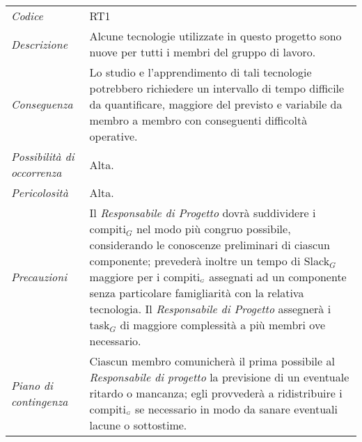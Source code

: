 \def\tabularxcolumn#1{m{#1}}
{

	\begin{center}
		\renewcommand{\arraystretch}{1.4}
		\begin{longtable}{|p{5cm}|p{12cm}|}
			\hline
			\rowcolor{airforceblue}
			\multicolumn{2}{|c|}{\textit{Inesperienza tecnologica}}\\
			\hline
			\textit{Codice} & RT1 \\
			\hline
			\textit{Descrizione} & Alcune tecnologie utilizzate in questo progetto sono nuove per tutti i membri del gruppo di lavoro. \\
			\hline
			\textit{Conseguenza} & Lo studio e l'apprendimento di tali tecnologie potrebbero richiedere un intervallo di tempo difficile da quantificare, maggiore del previsto e variabile da membro a membro con conseguenti difficoltà operative. \\
			\hline
			\textit{Possibilità di occorrenza} & Alta. \\
			\hline
			\textit{Pericolosità} & Alta. \\
			\hline
			\textit{Precauzioni} & Il \textit{Responsabile di Progetto} dovrà suddividere i compiti$_G$ nel modo più congruo possibile, considerando le conoscenze preliminari di ciascun componente; prevederà inoltre un tempo di Slack$_G$ maggiore per i compiti$_{\scaleto{G}{3pt}}$ assegnati ad un componente senza particolare famigliarità con la relativa tecnologia. Il \textit{Responsabile di Progetto} assegnerà i task$_G$ di maggiore complessità a più membri ove necessario.  \\
			\hline
			\textit{Piano di contingenza} & Ciascun membro comunicherà il prima possibile al \textit{Responsabile di progetto} la previsione di un eventuale ritardo o mancanza; egli provvederà a ridistribuire i compiti$_{\scaleto{G}{3pt}}$ se necessario in modo da sanare eventuali lacune o sottostime. \\
			\hline
		\end{longtable}
	\end{center}


\def\tabularxcolumn#1{m{#1}}
{

}}
